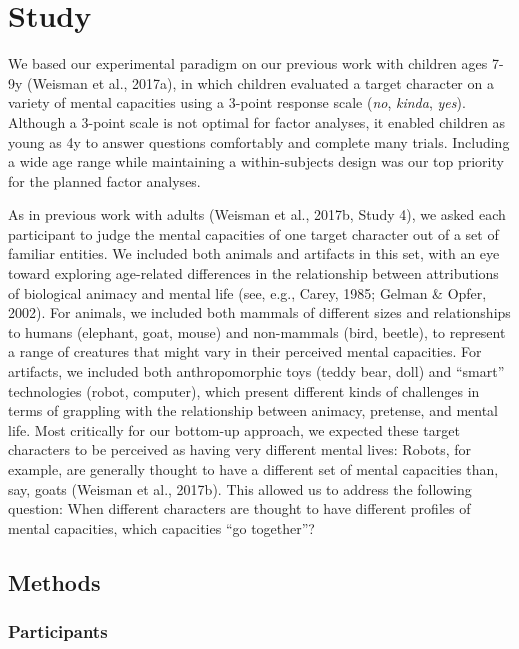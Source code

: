 \documentclass[10pt, letterpaper]{article}
\begin{document}
\section{Study}\label{study}

We based our experimental paradigm on our previous work with children
ages 7-9y (Weisman et al., 2017a), in which children evaluated a target
character on a variety of mental capacities using a 3-point response
scale (\emph{no}, \emph{kinda}, \emph{yes}). Although a 3-point scale is
not optimal for factor analyses, it enabled children as young as 4y to
answer questions comfortably and complete many trials. Including a wide
age range while maintaining a within-subjects design was our top
priority for the planned factor analyses.

As in previous work with adults (Weisman et al., 2017b, Study 4), we
asked each participant to judge the mental capacities of one target
character out of a set of familiar entities. We included both animals
and artifacts in this set, with an eye toward exploring age-related
differences in the relationship between attributions of biological
animacy and mental life (see, e.g., Carey, 1985; Gelman \& Opfer, 2002).
For animals, we included both mammals of different sizes and
relationships to humans (elephant, goat, mouse) and non-mammals (bird,
beetle), to represent a range of creatures that might vary in their
perceived mental capacities. For artifacts, we included both
anthropomorphic toys (teddy bear, doll) and ``smart'' technologies
(robot, computer), which present different kinds of challenges in terms
of grappling with the relationship between animacy, pretense, and mental
life. Most critically for our bottom-up approach, we expected these
target characters to be perceived as having very different mental lives:
Robots, for example, are generally thought to have a different set of
mental capacities than, say, goats (Weisman et al., 2017b). This allowed
us to address the following question: When different characters are
thought to have different profiles of mental capacities, which
capacities ``go together''?

\subsection{Methods}\label{methods}

\subsubsection{Participants}\label{participants}
\end{document}
